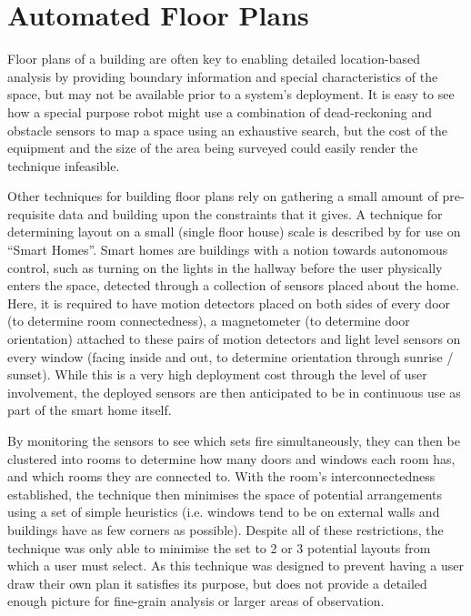 \documentclass{UoYCSproject}
\begin{document}
        \section{Automated Floor Plans}
        \label{sec:floorplans}
        
            Floor plans of a building are often key to enabling detailed location-based analysis by providing boundary information and special characteristics of the space, but may not be available prior to a system's deployment. It is easy to see how a special purpose robot might use a combination of dead-reckoning and obstacle sensors to map a space using an exhaustive search, but the cost of the equipment and the size of the area being surveyed could easily render the technique infeasible.
            
            Other techniques for building floor plans rely on gathering a small amount of pre-requisite data and building upon the constraints that it gives. A technique for determining layout on a small (single floor house) scale is described by \citet{lu2012smart} for use on ``Smart Homes''. Smart homes are buildings with a notion towards autonomous control, such as turning on the lights in the hallway before the user physically enters the space, detected through a collection of sensors placed about the home. Here, it is required to have motion detectors placed on both sides of every door (to determine room connectedness), a magnetometer (to determine door orientation) attached to these pairs of motion detectors and light level sensors on every window (facing inside and out, to determine orientation through sunrise / sunset). While this is a very high deployment cost through the level of user involvement, the deployed sensors are then anticipated to be in continuous use as part of the smart home itself.
            
            By monitoring the sensors to see which sets fire simultaneously, they can then be clustered into rooms to determine how many doors and windows each room has, and which rooms they are connected to. With the room's interconnectedness established, the technique then minimises the space of potential arrangements using a set of simple heuristics (i.e. windows tend to be on external walls and buildings have as few corners as possible). Despite all of these restrictions, the technique was only able to minimise the set to 2 or 3 potential layouts from which a user must select. As this technique was designed to prevent having a user draw their own plan it satisfies its purpose, but does not provide a detailed enough picture for fine-grain analysis or larger areas of observation.
            
\end{document}
